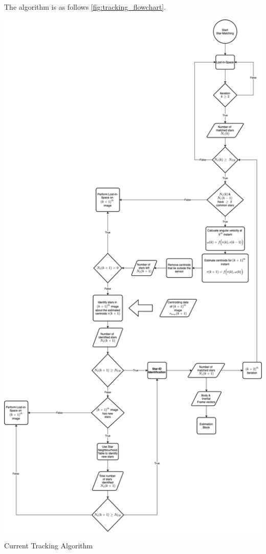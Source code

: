 \documentclass[../../main.tex]{subfiles}
\begin{document}
The algorithm is as follows  \ref{fig:tracking_flowchart}. 
\begin{Flowchart}
        \centering
        \includegraphics[scale=0.25]{Figures/GNC/tracking_flowchart.png}
        \caption{Current Tracking Algorithm}
        \label{fig:tracking_flowchart}
\end{Flowchart}
\end{document}
